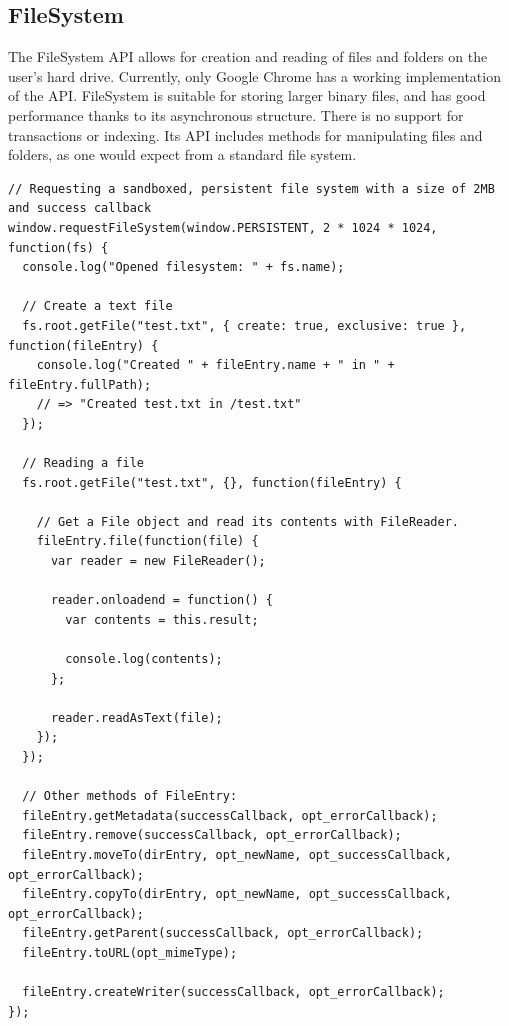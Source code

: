 \subsection{FileSystem}
\label{sec:filesystem}
The FileSystem API allows for creation and reading of files and folders on the user's hard drive. Currently, only Google Chrome has a working implementation of the API. FileSystem is suitable for storing larger binary files, and has good performance thanks to its asynchronous structure. There is no support for transactions or indexing. Its API includes methods for manipulating files and folders, as one would expect from a standard file system.

\begin{Code}
\begin{lstlisting}[caption={Use of FileSystem}, label={lst:filesystem}]
// Requesting a sandboxed, persistent file system with a size of 2MB and success callback
window.requestFileSystem(window.PERSISTENT, 2 * 1024 * 1024, function(fs) {
  console.log("Opened filesystem: " + fs.name);

  // Create a text file
  fs.root.getFile("test.txt", { create: true, exclusive: true }, function(fileEntry) {
    console.log("Created " + fileEntry.name + " in " + fileEntry.fullPath);
    // => "Created test.txt in /test.txt"
  });

  // Reading a file
  fs.root.getFile("test.txt", {}, function(fileEntry) {

    // Get a File object and read its contents with FileReader.
    fileEntry.file(function(file) {
      var reader = new FileReader();

      reader.onloadend = function() {
        var contents = this.result;

        console.log(contents);
      };

      reader.readAsText(file);
    });
  });

  // Other methods of FileEntry:
  fileEntry.getMetadata(successCallback, opt_errorCallback);
  fileEntry.remove(successCallback, opt_errorCallback);
  fileEntry.moveTo(dirEntry, opt_newName, opt_successCallback, opt_errorCallback);
  fileEntry.copyTo(dirEntry, opt_newName, opt_successCallback, opt_errorCallback);
  fileEntry.getParent(successCallback, opt_errorCallback);
  fileEntry.toURL(opt_mimeType);

  fileEntry.createWriter(successCallback, opt_errorCallback);
});
\end{lstlisting}
\end{Code}

